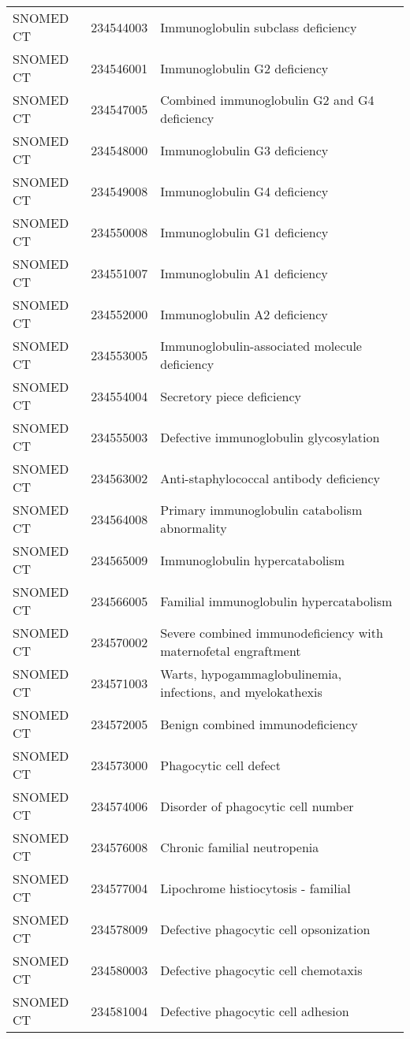 \begin{table}[ht]
\begin{tabular}{lll}
  SNOMED CT & 234544003 & Immunoglobulin subclass deficiency \\ 
  SNOMED CT & 234546001 & Immunoglobulin G2 deficiency \\ 
  SNOMED CT & 234547005 & Combined immunoglobulin G2 and G4 deficiency \\ 
  SNOMED CT & 234548000 & Immunoglobulin G3 deficiency \\ 
  SNOMED CT & 234549008 & Immunoglobulin G4 deficiency \\ 
  SNOMED CT & 234550008 & Immunoglobulin G1 deficiency \\ 
  SNOMED CT & 234551007 & Immunoglobulin A1 deficiency \\ 
  SNOMED CT & 234552000 & Immunoglobulin A2 deficiency \\ 
  SNOMED CT & 234553005 & Immunoglobulin-associated molecule deficiency \\ 
  SNOMED CT & 234554004 & Secretory piece deficiency \\ 
  SNOMED CT & 234555003 & Defective immunoglobulin glycosylation \\ 
  SNOMED CT & 234563002 & Anti-staphylococcal antibody deficiency \\ 
  SNOMED CT & 234564008 & Primary immunoglobulin catabolism abnormality \\ 
  SNOMED CT & 234565009 & Immunoglobulin hypercatabolism \\ 
  SNOMED CT & 234566005 & Familial immunoglobulin hypercatabolism \\ 
  SNOMED CT & 234570002 & Severe combined immunodeficiency with maternofetal engraftment \\ 
  SNOMED CT & 234571003 & Warts, hypogammaglobulinemia, infections, and myelokathexis \\ 
  SNOMED CT & 234572005 & Benign combined immunodeficiency \\ 
  SNOMED CT & 234573000 & Phagocytic cell defect \\ 
  SNOMED CT & 234574006 & Disorder of phagocytic cell number \\ 
  SNOMED CT & 234576008 & Chronic familial neutropenia \\ 
  SNOMED CT & 234577004 & Lipochrome histiocytosis - familial \\ 
  SNOMED CT & 234578009 & Defective phagocytic cell opsonization \\ 
  SNOMED CT & 234580003 & Defective phagocytic cell chemotaxis \\ 
  SNOMED CT & 234581004 & Defective phagocytic cell adhesion \\ 

\end{tabular}
\end{table}
